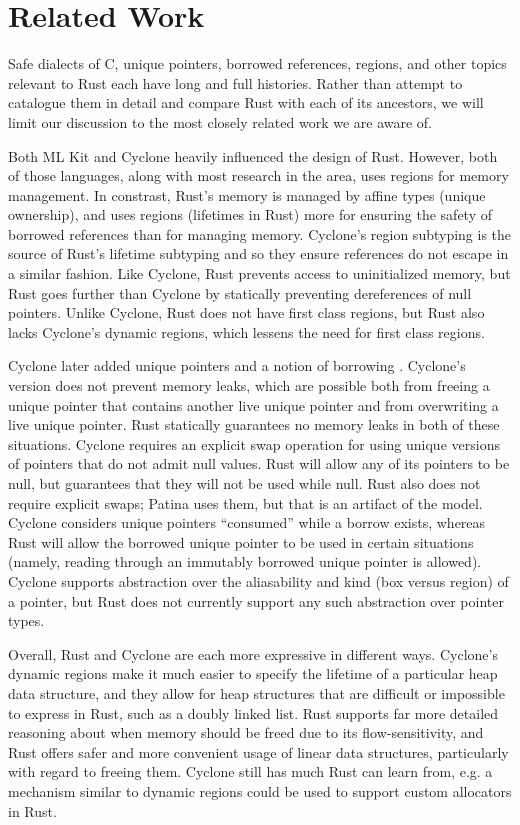\section*{Related Work}

Safe dialects of C, unique pointers, borrowed references, 
regions, and other topics relevant to Rust each have long
and full histories. Rather than attempt to catalogue them in detail
and compare Rust with each of its ancestors, we will limit our discussion
to the most closely related work we are aware of.

Both ML Kit \cite{mlkit-4.3.0, mlkitregions}
and Cyclone \cite{cycregions} heavily influenced the design of Rust.
However, both of those languages, along with most research in the area,
uses regions for memory management. In constrast, Rust's memory is managed
by affine types (unique ownership), and uses regions (lifetimes in Rust)
more for ensuring the safety of borrowed references than for managing memory.
Cyclone's region subtyping is the source of Rust's lifetime subtyping
and so they ensure references do not escape in a similar fashion.
Like Cyclone, Rust prevents access to uninitialized memory,
but Rust goes further than Cyclone by statically preventing dereferences of null pointers.
Unlike Cyclone, Rust does not have first class regions, but Rust also
lacks Cyclone's dynamic regions, which lessens the need for first class regions.

Cyclone later added unique pointers and a notion of borrowing \cite{cycsafe, cycexperience}.
Cyclone's version does not prevent memory leaks, which are possible both from
freeing a unique pointer that contains another live unique pointer and from
overwriting a live unique pointer. Rust statically guarantees no memory leaks in both
of these situations. Cyclone requires an explicit swap operation for using unique versions
of pointers that do not admit null values. Rust will allow any of its pointers to be null,
but guarantees that they will not be used while null. Rust also does not require explicit swaps;
Patina uses them, but that is an artifact of the model.
Cyclone considers unique pointers ``consumed'' while a borrow exists, 
whereas Rust will allow the borrowed unique pointer to be used in certain situations
(namely, reading through an immutably borrowed unique pointer is allowed).
Cyclone supports abstraction over the aliasability and kind (box versus region) of a pointer,
but Rust does not currently support any such abstraction over pointer types.

Overall, Rust and Cyclone are each more expressive in different ways.
Cyclone's dynamic regions make it much easier to specify the lifetime of
a particular heap data structure, and they allow for heap structures that
are difficult or impossible to express in Rust, such as a doubly linked list.
Rust supports far more detailed reasoning about when memory should be freed
due to its flow-sensitivity, and Rust offers safer and more convenient
usage of linear data structures, particularly with regard to freeing them.
Cyclone still has much Rust can learn from, e.g. a mechanism similar to
dynamic regions could be used to support custom allocators in Rust.

